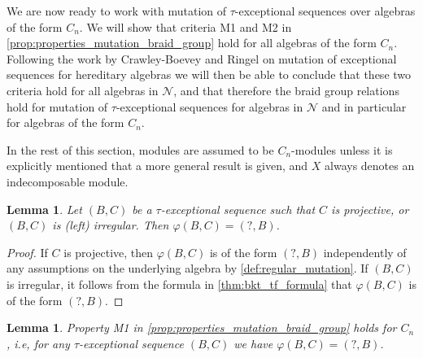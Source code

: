 \documentclass[11pt]{amsart}
\newtheorem{lemma}[theorem]{Lemma}
\theoremstyle{definition}
\begin{document}
We are now ready to work with mutation of $\tau$-exceptional sequences over algebras of the form $C_n$. We will show that criteria M1 and M2 in \cref{prop:properties_mutation_braid_group} hold for all algebras of the form $C_n$. Following the work by Crawley-Boevey \cite{cbw92} and Ringel \cite{ringel_exceptional} on mutation of exceptional sequences for hereditary algebras we will then be able to conclude that these two criteria hold for all algebras in $\mathcal{N}$, and that therefore the braid group relations hold for mutation of $\tau$-exceptional sequences for algebras in $\mathcal{N}$ and in particular for algebras of the form $C_n$.

In the rest of this section, modules are assumed to be $C_n$-modules unless it is explicitly mentioned that a more general result is given, and $X$ always denotes an indecomposable module.

\begin{lemma}\label{lem:mutationCprojectiveorleftirregular}
    Let $(B,C)$ be a $\tau$-exceptional sequence such that $C$ is projective, or $(B,C)$ is (left) irregular. Then $\varphi(B,C) = (?,B)$.
\end{lemma}

\begin{proof}
    If $C$ is projective, then $\varphi(B,C)$ is of the form $(?,B)$ independently of any assumptions on the underlying algebra by \cref{def:regular_mutation}. If $(B,C)$ is irregular, it follows from the formula in \cref{thm:bkt_tf_formula} that $\varphi(B,C)$ is of the form $(?,B)$.
\end{proof}

\begin{lemma} \label{prop:property_1_c_n}
    Property M1 in \cref{prop:properties_mutation_braid_group} holds for $C_n$, i.e, for any $\tau$-exceptional sequence $(B,C)$ we have $\varphi(B,C) = (?,B)$.
\end{lemma}
\end{document}
